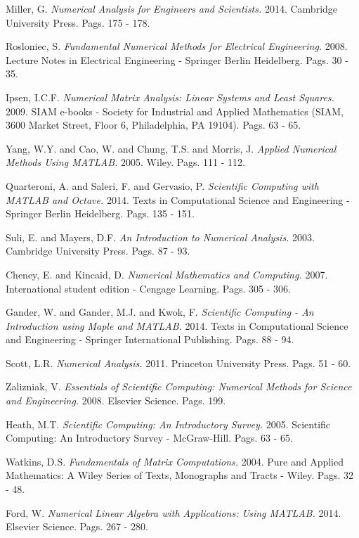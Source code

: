 
 Miller, G. {\em Numerical Analysis for Engineers and Scientists.} 2014. Cambridge University Press. Pags. 175 - 178.

 Rosloniec, S. {\em Fundamental Numerical Methods for Electrical Engineering.} 2008. Lecture Notes in Electrical Engineering - Springer Berlin Heidelberg. Pags. 30 - 35.


 Ipsen, I.C.F. {\em Numerical Matrix Analysis: Linear Systems and Least Squares.} 2009. SIAM e-books - Society for Industrial and Applied Mathematics (SIAM, 3600 Market Street, Floor 6, Philadelphia, PA 19104). Pags. 63 - 65.

 Yang, W.Y. and Cao, W. and Chung, T.S. and Morris, J. {\em Applied Numerical Methods Using MATLAB.} 2005. Wiley. Pags. 111 - 112.

 Quarteroni, A. and Saleri, F. and Gervasio, P. {\em Scientific Computing with MATLAB and Octave.} 2014. Texts in Computational Science and Engineering - Springer Berlin Heidelberg. Pags. 135 - 151.

 Suli, E. and Mayers, D.F. {\em An Introduction to Numerical Analysis.} 2003. Cambridge University Press. Pags. 87 - 93.

 Cheney, E. and Kincaid, D. {\em Numerical Mathematics and Computing.} 2007. International student edition - Cengage Learning. Pags. 305 - 306.

 Gander, W. and Gander, M.J. and Kwok, F. {\em Scientific Computing - An Introduction using Maple and MATLAB.} 2014. Texts in Computational Science and Engineering - Springer International Publishing. Pags. 88 - 94.

 Scott, L.R. {\em Numerical Analysis.} 2011. Princeton University Press. Pags. 51 - 60.

 Zalizniak, V. {\em Essentials of Scientific Computing: Numerical Methods for Science and Engineering.} 2008. Elsevier Science. Pags. 199.

 Heath, M.T. {\em Scientific Computing: An Introductory Survey.} 2005. Scientific Computing: An Introductory Survey - McGraw-Hill. Pags. 63 - 65.

 Watkins, D.S. {\em Fundamentals of Matrix Computations.} 2004. Pure and Applied Mathematics: A Wiley Series of Texts, Monographs and Tracts - Wiley. Pags. 32 - 48.

 Ford, W. {\em Numerical Linear Algebra with Applications: Using MATLAB.} 2014. Elsevier Science. Pags. 267 - 280.

